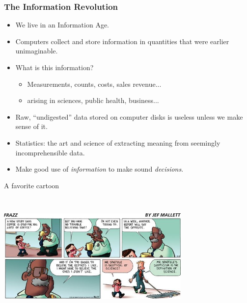 \documentclass[
10pt]{beamer}
\begin{document}
\begin{frame}
    \frametitle{The Information Revolution}
    \begin{itemize}\setlength{\itemsep}{0.3cm}
        \item We live in an Information Age.  \pause
        \item Computers collect and store information in quantities that were earlier unimaginable. \pause
        \item What is this information? \pause
        \begin{itemize}
            \item Measurements, counts, costs, sales revenue...
            \item arising in sciences, public health, business...
        \end{itemize} \pause
        \item Raw, ``undigested'' data stored on computer disks is useless unless we make sense of it. \pause
        \item Statistics: the art and science of extracting meaning from seemingly incomprehensible data. \pause
        \item Make good use of \emph{information} to make sound \emph{decisions}.
    \end{itemize}
\end{frame}


\begin{frame}{A favorite cartoon}

\begin{center}
\includegraphics[height=2.5in,width=3.75in]{figs/Frazz_04_19_2015.jpg} 
\end{center}
 
\end{frame}
\end{document}
